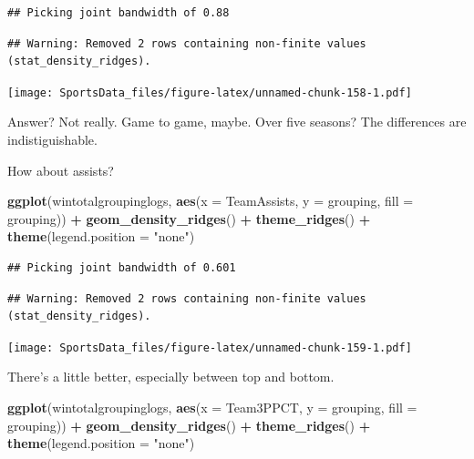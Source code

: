 \documentclass[]{book}
\newenvironment{Shaded}{\begin{snugshade}}{\end{snugshade}}
\newcommand{\KeywordTok}[1]{\textcolor[rgb]{0.13,0.29,0.53}{\textbf{#1}}}
\newcommand{\DataTypeTok}[1]{\textcolor[rgb]{0.13,0.29,0.53}{#1}}
\newcommand{\StringTok}[1]{\textcolor[rgb]{0.31,0.60,0.02}{#1}}
\newcommand{\OperatorTok}[1]{\textcolor[rgb]{0.81,0.36,0.00}{\textbf{#1}}}
\newcommand{\NormalTok}[1]{#1}
\begin{document}
\begin{verbatim}
## Picking joint bandwidth of 0.88
\end{verbatim}

\begin{verbatim}
## Warning: Removed 2 rows containing non-finite values (stat_density_ridges).
\end{verbatim}

\texttt{[image: SportsData\_files/figure-latex/unnamed-chunk-158-1.pdf]}

Answer? Not really. Game to game, maybe. Over five seasons? The
differences are indistiguishable.

How about assists?

\begin{Shaded}
\begin{Highlighting}[]
\KeywordTok{ggplot}\NormalTok{(wintotalgroupinglogs, }\KeywordTok{aes}\NormalTok{(}\DataTypeTok{x =}\NormalTok{ TeamAssists, }\DataTypeTok{y =}\NormalTok{ grouping, }\DataTypeTok{fill =}\NormalTok{ grouping)) }\OperatorTok{+}
\StringTok{  }\KeywordTok{geom_density_ridges}\NormalTok{() }\OperatorTok{+}
\StringTok{  }\KeywordTok{theme_ridges}\NormalTok{() }\OperatorTok{+}\StringTok{ }
\StringTok{  }\KeywordTok{theme}\NormalTok{(}\DataTypeTok{legend.position =} \StringTok{"none"}\NormalTok{)}
\end{Highlighting}
\end{Shaded}

\begin{verbatim}
## Picking joint bandwidth of 0.601
\end{verbatim}

\begin{verbatim}
## Warning: Removed 2 rows containing non-finite values (stat_density_ridges).
\end{verbatim}

\texttt{[image: SportsData\_files/figure-latex/unnamed-chunk-159-1.pdf]}

There's a little better, especially between top and bottom.

\begin{Shaded}
\begin{Highlighting}[]
\KeywordTok{ggplot}\NormalTok{(wintotalgroupinglogs, }\KeywordTok{aes}\NormalTok{(}\DataTypeTok{x =}\NormalTok{ Team3PPCT, }\DataTypeTok{y =}\NormalTok{ grouping, }\DataTypeTok{fill =}\NormalTok{ grouping)) }\OperatorTok{+}
\StringTok{  }\KeywordTok{geom_density_ridges}\NormalTok{() }\OperatorTok{+}
\StringTok{  }\KeywordTok{theme_ridges}\NormalTok{() }\OperatorTok{+}\StringTok{ }
\StringTok{  }\KeywordTok{theme}\NormalTok{(}\DataTypeTok{legend.position =} \StringTok{"none"}\NormalTok{)}
\end{Highlighting}
\end{Shaded}
\end{document}
